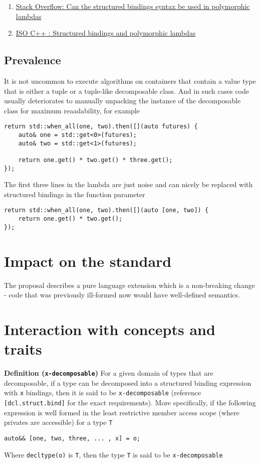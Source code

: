 \documentclass{article}
\begin{document}
\begin{enumerate}
    \item \href{https://stackoverflow.com/questions/45541334}{Stack Overflow:
        Can the structured bindings syntax be used in polymorphic lambdas}
    \item \href{https://goo.gl/fRSwNg}{ISO C++ : Structured bindings and
        polymorphic lambdas}
\end{enumerate}

\subsection{Prevalence}
It is not uncommon to execute algorithms on containers that contain a value
type that is either a tuple or a tuple-like decomposable class.  And in such
cases code usually deteriorates to manually unpacking the instance of the
decomposable class for maximum reaadability, for example

\begin{lstlisting}
return std::when_all(one, two).then([](auto futures) {
    auto& one = std::get<0>(futures);
    auto& two = std::get<1>(futures);

    return one.get() * two.get() * three.get();
});
\end{lstlisting}

The first three lines in the lambda are just noise and can nicely be replaced
with structured bindings in the function parameter

\begin{lstlisting}
return std::when_all(one, two).then([](auto [one, two]) {
    return one.get() * two.get();
});
\end{lstlisting}


\section{Impact on the standard}
The proposal describes a pure language extension which is a non-breaking
change - code that was previously ill-formed now would have well-defined
semantics.


\section{Interaction with concepts and traits}
\textbf{Definition (\texttt{x-decomposable})} For a given domain of types that
are decomposable, if a type can be decomposed into a structured binding
expression with \texttt{x} bindings, then it is said to be
\texttt{x-decomposable} (reference \texttt{[dcl.struct.bind]} for the exact
requirements).  More specifically, if the following expression is well formed
in the least restrictive member access scope (where privates are accessible)
for a type \texttt{T}
\begin{lstlisting}
auto&& [one, two, three, ... , x] = o;
\end{lstlisting}
Where \texttt{decltype(o)} is \texttt{T}, then the type \texttt{T} is said to
be \texttt{x-decomposable}
\end{document}

